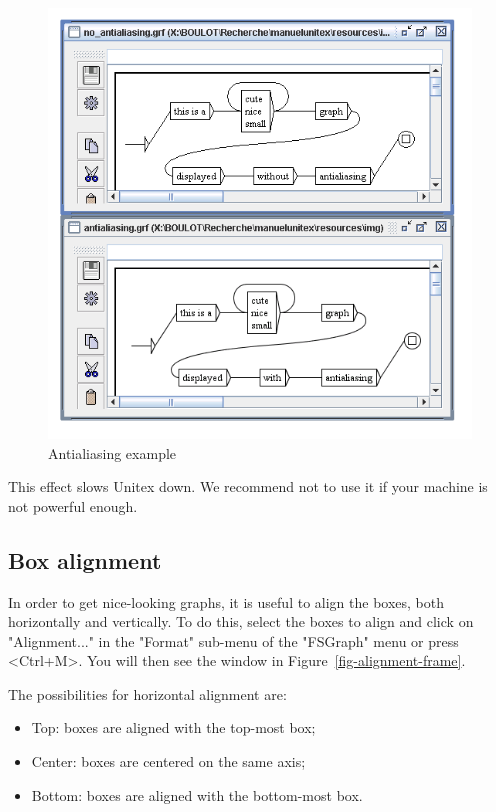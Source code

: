 \bigskip
\begin{figure}[!ht]
\begin{center}
\includegraphics[width=13.5cm]{resources/img/fig5-22.png}
\caption{Antialiasing example\label{fig-antialiasing}}
\end{center}
\end{figure}

\noindent This effect slows Unitex down. We recommend  not to use it if your
machine is not powerful enough.

\clearpage 
\subsection{Box alignment}

In order to get nice-looking graphs, it is useful to align the boxes, both
horizontally and  vertically. To do this, select the boxes to align and click on
"Alignment..." in the "Format" sub-menu of the "FSGraph" menu or press <Ctrl+M>.
You will then see the window in Figure~\ref{fig-alignment-frame}.

\bigskip
\noindent The possibilities for horizontal alignment are:
\begin{itemize}
  \item Top: boxes are aligned with  the top-most box;
  \item Center: boxes are centered on the same axis;
  \item Bottom: boxes are aligned with the bottom-most box.
\end{itemize}

